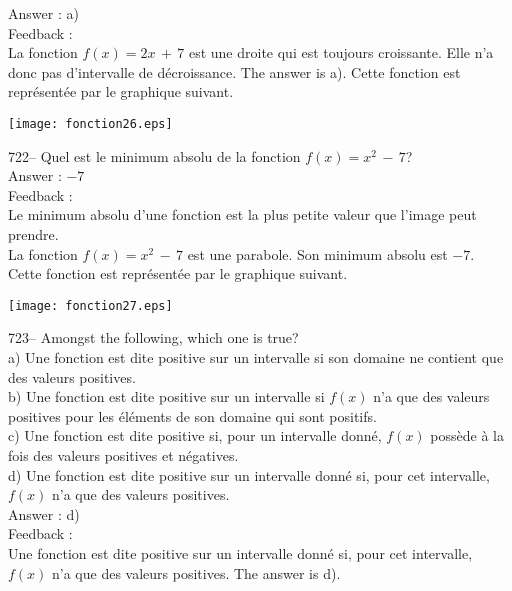 ﻿\documentclass[letterpaper, 12pt]{article}
\begin{document}
Answer : a)\\

Feedback : \\
La fonction $f(x)=2x\,+\,7$ est une droite qui est toujours croissante.
Elle n'a donc pas d'intervalle de d\'ecroissance.  The answer is a).
Cette fonction est repr\'esent\'ee par le graphique suivant.\\
    \begin{center}
    \texttt{[image: fonction26.eps]}
    \end{center}


722-- Quel est le minimum absolu de la fonction $f(x)=x^{2}\,-\,7$?\\

Answer : $-7$\\

Feedback : \\
Le minimum absolu d'une fonction est la plus petite valeur que l'image peut
prendre.\\
La fonction $f(x)=x^{2}\,-\,7$ est une parabole.  Son minimum absolu est
$-7$.  Cette fonction est repr\'esent\'ee par le graphique suivant.\\
    \begin{center}
    \texttt{[image: fonction27.eps]}
    \end{center}


723-- Amongst the following, which one is true?\\
a) Une fonction est dite positive sur un intervalle si son domaine ne
contient que des valeurs positives.\\
b) Une fonction est dite positive sur un intervalle si $f(x)$ n'a que des
valeurs positives pour les \'el\'ements de son domaine qui sont positifs.\\
c) Une fonction est dite positive si, pour un intervalle donn\'e, $f(x)$
poss\`ede \`a la fois des valeurs positives et n\'egatives.\\
d) Une fonction est dite positive sur un intervalle donn\'e si, pour cet
intervalle, $f(x)$ n'a que des valeurs positives.  \\

Answer :  d)\\

Feedback : \\
Une fonction est dite positive sur un intervalle donn\'e si, pour cet
intervalle, $f(x)$ n'a que des valeurs positives. The answer is d).\\
\end{document}
